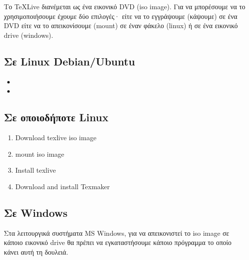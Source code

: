 \documentclass[letterpaper,10pt,greek]{sphinxhowto}
\begin{document}
\sphinxAtStartPar
Το TeXLive διανέμεται ως ένα εικονικό DVD (iso image). Για να μπορέσουμε
να το χρησιμοποιήσουμε έχουμε δύο επιλογές· είτε να το εγγράψουμε (κάψουμε)
σε ένα DVD είτε να το απεικονίσουμε (mount) σε έναν φάκελο (linux) ή σε
ένα εικονικό drive (windows).


\subsection{Σε Linux Debian/Ubuntu}
\label{\detokenize{HowToInstallLaTeX:linux-debian-ubuntu}}\begin{itemize}
\item {} 
\sphinxAtStartPar
{}

\item {} 
\sphinxAtStartPar
{}

\end{itemize}


\subsection{Σε οποιοδήποτε Linux}
\label{\detokenize{HowToInstallLaTeX:linux}}\begin{enumerate}
%
\item {} 
\sphinxAtStartPar
Download texlive iso image

\item {} 
\sphinxAtStartPar
mount iso image

\item {} 
\sphinxAtStartPar
Install texlive

\item {} 
\sphinxAtStartPar
Download and install Texmaker

\end{enumerate}


\subsection{Σε Windows}
\label{\detokenize{HowToInstallLaTeX:windows}}
\sphinxAtStartPar
Στα λειτουργικά συστήματα MS Windows, για να απεικονιστεί το iso image
σε κάποιο εικονικό drive θα πρέπει να εγκαταστήσουμε κάποιο πρόγραμμα
το οποίο κάνει αυτή τη δουλειά.
\end{document}

